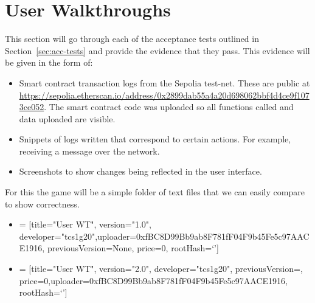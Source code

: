 
\chapter{User Walkthroughs}\label{app:user-walkthrough}

This section will go through each of the acceptance tests outlined in Section~\ref{sec:acc-tests} and provide the evidence that they pass. This evidence will be given in the form of:

\begin{itemize}
  \item Smart contract transaction logs from the Sepolia test-net. These are public at \small\url{https://sepolia.etherscan.io/address/0x2899dab55a4a20d698062bbf4d4ce9f1073ce052}\normalsize. The smart contract code was uploaded so all functions called and data uploaded are visible.
  \item Snippets of logs written that correspond to certain actions. For example, receiving a message over the network.
  \item Screenshots to show changes being reflected in the user interface.
\end{itemize}

\newparagraph
For this the game will be a simple folder of text files that we can easily compare to show correctness.

\small
\begin{itemize}
  \item {} = [title="User WT", version="1.0", developer="tcs1g20",\newline uploader=0xfBC8D99Bb9ab8F781fF04F9b45Fe5c97AACE1916, previousVersion=None, price=0, rootHash=`']
  \item {} = [title="User WT", version="2.0", developer="tcs1g20", previousVersion=, price=0,\newline uploader=0xfBC8D99Bb9ab8F781fF04F9b45Fe5c97AACE1916, rootHash=`']
\end{itemize}
\normalsize





